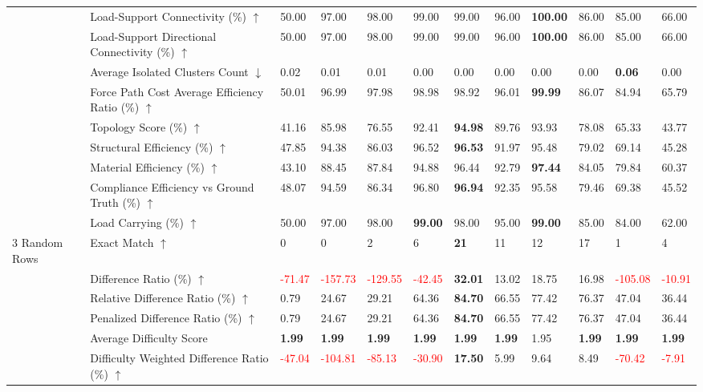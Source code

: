 \begin{table}[!h]
{\begin{tabular}{llllllllllll}
 & Load-Support Connectivity (\%) $\uparrow$ & 50.00 & 97.00 & 98.00 & 99.00 & 99.00 & 96.00 & \textbf{100.00} & 86.00 & 85.00 & 66.00 \\
 & Load-Support Directional Connectivity (\%) $\uparrow$ & 50.00 & 97.00 & 98.00 & 99.00 & 99.00 & 96.00 & \textbf{100.00} & 86.00 & 85.00 & 66.00 \\
 & Average Isolated Clusters Count $\downarrow$ & 0.02 & 0.01 & 0.01 & 0.00 & 0.00 & 0.00 & 0.00 & 0.00 & \textbf{0.06} & 0.00 \\
 & Force Path Cost Average Efficiency Ratio (\%) $\uparrow$ & 50.01 & 96.99 & 97.98 & 98.98 & 98.92 & 96.01 & \textbf{99.99} & 86.07 & 84.94 & 65.79 \\
 & Topology Score (\%) $\uparrow$ & 41.16 & 85.98 & 76.55 & 92.41 & \textbf{94.98} & 89.76 & 93.93 & 78.08 & 65.33 & 43.77 \\
 & Structural Efficiency (\%) $\uparrow$ & 47.85 & 94.38 & 86.03 & 96.52 & \textbf{96.53} & 91.97 & 95.48 & 79.02 & 69.14 & 45.28 \\
 & Material Efficiency (\%) $\uparrow$ & 43.10 & 88.45 & 87.84 & 94.88 & 96.44 & 92.79 & \textbf{97.44} & 84.05 & 79.84 & 60.37 \\
 & Compliance Efficiency vs Ground Truth (\%) $\uparrow$ & 48.07 & 94.59 & 86.34 & 96.80 & \textbf{96.94} & 92.35 & 95.58 & 79.46 & 69.38 & 45.52 \\
 & Load Carrying (\%) $\uparrow$ & 50.00 & 97.00 & 98.00 & \textbf{99.00} & 98.00 & 95.00 & \textbf{99.00} & 85.00 & 84.00 & 62.00 \\
3 Random Rows & Exact Match $\uparrow$ & 0 & 0 & 2 & 6 & \textbf{21} & 11 & 12 & 17 & 1 & 4 \\
 & Difference Ratio (\%) $\uparrow$ & \textcolor{red}{-71.47} & \textcolor{red}{-157.73} & \textcolor{red}{-129.55} & \textcolor{red}{-42.45} & \textbf{32.01} & 13.02 & 18.75 & 16.98 & \textcolor{red}{-105.08} & \textcolor{red}{-10.91} \\
 & Relative Difference Ratio (\%) $\uparrow$ & 0.79 & 24.67 & 29.21 & 64.36 & \textbf{84.70} & 66.55 & 77.42 & 76.37 & 47.04 & 36.44 \\
 & Penalized Difference Ratio (\%) $\uparrow$ & 0.79 & 24.67 & 29.21 & 64.36 & \textbf{84.70} & 66.55 & 77.42 & 76.37 & 47.04 & 36.44 \\
 & Average Difficulty Score & \textbf{1.99} & \textbf{1.99} & \textbf{1.99} & \textbf{1.99} & \textbf{1.99} & \textbf{1.99} & 1.95 & \textbf{1.99} & \textbf{1.99} & \textbf{1.99} \\
 & Difficulty Weighted Difference Ratio (\%) $\uparrow$ & \textcolor{red}{-47.04} & \textcolor{red}{-104.81} & \textcolor{red}{-85.13} & \textcolor{red}{-30.90} & \textbf{17.50} & 5.99 & 9.64 & 8.49 & \textcolor{red}{-70.42} & \textcolor{red}{-7.91} \\

\end{tabular}}
\end{table}
